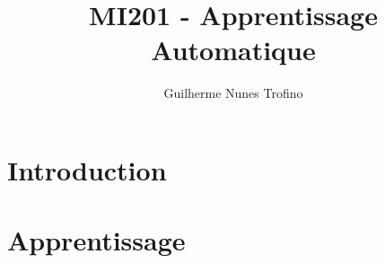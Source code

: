 \documentclass{article}
\title{MI201 - Apprentissage Automatique}
\author{Guilherme Nunes Trofino}
\begin{document}
\maketitle
\setlength{\parindent}{0pt}

\newpage\tableofcontents

\section{Introduction}

% 
% 

\section{Apprentissage}
\end{document}
